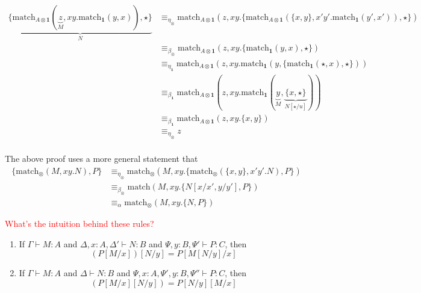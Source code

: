 \documentclass[acmsmall,screen, nonacm, anonymous]{acmart}
\begin{document}
\begin{itemize}
\begin{align*}
  \underbrace{\{\text{match}_{A \otimes \mathbf{1}}(\underbrace{z}_{M}, xy.\text{match}_{\mathbf{1}}(y,x)), \star\}}_{N} &\equiv_{\eta_{\otimes}} \text{match}_{A \otimes \mathbf{1}}(z, xy.\{\text{match}_{A \otimes \mathbf{1}}(\{x,y\}, x'y'.\text{match}_{\mathbf{1}}(y',x')), \star\})\\ 
  &\equiv_{\beta_{\otimes}} \text{match}_{A \otimes \mathbf{1}}(z,xy.\{{\text{match}_{\mathbf{1}}(y,x), \star}\})\\
  &\equiv_{\eta_{\mathbf{1}}}\text{match}_{A \otimes \mathbf{1}}(z, xy.\text{match}_{\mathbf{1}}(y,\{\text{match}_{\mathbf{1}}(\star,x), \star\}))\\
  &\equiv_{\beta_{\mathbf{1}}} \text{match}_{A \otimes \mathbf{1}}(z, xy.\text{match}_{\mathbf{1}}(\underbrace{y}_{M},\underbrace{\{x, \star\}}_{N[\star / u]}))\\
  &\equiv_{\beta_{\mathbf{1}}} \text{match}_{A \otimes \mathbf{1}}(z, xy.\{x, y\})\\
  &\equiv_{\eta_{\otimes}} z\\
\end{align*}
  
The above proof uses a more general statement that 
\begin{align*}
\{\text{match}_{\otimes}(M, xy.N), P\} &\equiv_{\eta_{\otimes}} \text{match}_{\otimes}(M,xy.\{\text{match}_{\otimes}(\{x,y\}, x'y'.N), P\})\\
&\equiv_{\beta_{\otimes}} \text{match}(M,xy.\{N[x/x',y/y'], P\})\\
&\equiv_{\alpha} \text{match}_{\otimes}(M,xy.\{N,P\})
\end{align*}

\textcolor{red}{What's the intuition behind these rules?}

\end{itemize}

\begin{lemma}
  \begin{enumerate}
  \item If $\Gamma \vdash M : A$ and $\Delta, x : A, \Delta' \vdash N : B$ and $\Psi, y : B, \Psi' \vdash P : C$, then
  \[
  (P[M/x])[N/y] = P[M[N/y]/x]
  \]
  \item If $\Gamma \vdash M : A$ and $\Delta \vdash N : B$ and $\Psi, x : A, \Psi', y : B, \Psi'' \vdash P : C$, then
  \[
  (P[M/x][N/y]) = P[N/y][M/x]
  \]
  \end{enumerate}
\end{lemma}
\end{document}
